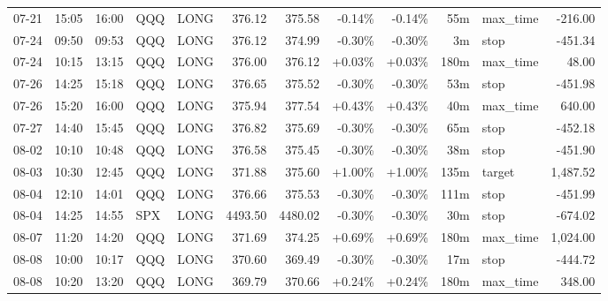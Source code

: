 \documentclass[11pt,a4paper,twoside]{article}
\begin{document}
\begin{center}
\begin{longtable}{>{\color{txtmain}}l l l l l r r r r r >{\color{txtmain}}l r}
07-21 & 15:05 & 16:00 & QQQ & LONG & 376.12 & 375.58 & \textcolor{lossred}{-0.14\%} & \textcolor{lossred}{-0.14\%} & 55m & max\_time & \textcolor{lossred}{-216.00} \\
07-24 & 09:50 & 09:53 & QQQ & LONG & 376.12 & 374.99 & \textcolor{lossred}{-0.30\%} & \textcolor{lossred}{-0.30\%} & 3m & stop & \textcolor{lossred}{-451.34} \\
07-24 & 10:15 & 13:15 & QQQ & LONG & 376.00 & 376.12 & \textcolor{wingreen}{+0.03\%} & \textcolor{wingreen}{+0.03\%} & 180m & max\_time & \textcolor{wingreen}{48.00} \\
07-26 & 14:25 & 15:18 & QQQ & LONG & 376.65 & 375.52 & \textcolor{lossred}{-0.30\%} & \textcolor{lossred}{-0.30\%} & 53m & stop & \textcolor{lossred}{-451.98} \\
07-26 & 15:20 & 16:00 & QQQ & LONG & 375.94 & 377.54 & \textcolor{wingreen}{+0.43\%} & \textcolor{wingreen}{+0.43\%} & 40m & max\_time & \textcolor{wingreen}{640.00} \\
07-27 & 14:40 & 15:45 & QQQ & LONG & 376.82 & 375.69 & \textcolor{lossred}{-0.30\%} & \textcolor{lossred}{-0.30\%} & 65m & stop & \textcolor{lossred}{-452.18} \\
08-02 & 10:10 & 10:48 & QQQ & LONG & 376.58 & 375.45 & \textcolor{lossred}{-0.30\%} & \textcolor{lossred}{-0.30\%} & 38m & stop & \textcolor{lossred}{-451.90} \\
08-03 & 10:30 & 12:45 & QQQ & LONG & 371.88 & 375.60 & \textcolor{wingreen}{+1.00\%} & \textcolor{wingreen}{+1.00\%} & 135m & target & \textcolor{wingreen}{1,487.52} \\
08-04 & 12:10 & 14:01 & QQQ & LONG & 376.66 & 375.53 & \textcolor{lossred}{-0.30\%} & \textcolor{lossred}{-0.30\%} & 111m & stop & \textcolor{lossred}{-451.99} \\
08-04 & 14:25 & 14:55 & SPX & LONG & 4493.50 & 4480.02 & \textcolor{lossred}{-0.30\%} & \textcolor{lossred}{-0.30\%} & 30m & stop & \textcolor{lossred}{-674.02} \\
08-07 & 11:20 & 14:20 & QQQ & LONG & 371.69 & 374.25 & \textcolor{wingreen}{+0.69\%} & \textcolor{wingreen}{+0.69\%} & 180m & max\_time & \textcolor{wingreen}{1,024.00} \\
08-08 & 10:00 & 10:17 & QQQ & LONG & 370.60 & 369.49 & \textcolor{lossred}{-0.30\%} & \textcolor{lossred}{-0.30\%} & 17m & stop & \textcolor{lossred}{-444.72} \\
08-08 & 10:20 & 13:20 & QQQ & LONG & 369.79 & 370.66 & \textcolor{wingreen}{+0.24\%} & \textcolor{wingreen}{+0.24\%} & 180m & max\_time & \textcolor{wingreen}{348.00} \\

\end{longtable}
\end{center}
\end{document}
